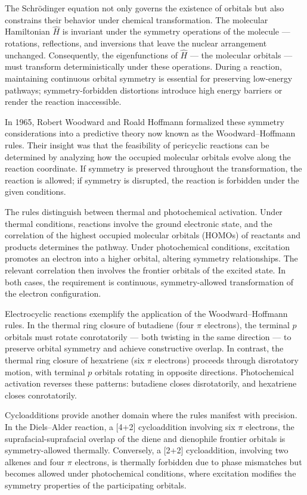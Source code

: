 The Schrödinger equation not only governs the existence of orbitals but also constrains their behavior under chemical transformation. The molecular Hamiltonian $\hat{H}$ is invariant under the symmetry operations of the molecule — rotations, reflections, and inversions that leave the nuclear arrangement unchanged. Consequently, the eigenfunctions of $\hat{H}$ — the molecular orbitals — must transform deterministically under these operations. During a reaction, maintaining continuous orbital symmetry is essential for preserving low-energy pathways; symmetry-forbidden distortions introduce high energy barriers or render the reaction inaccessible.

In 1965, Robert Woodward and Roald Hoffmann formalized these symmetry considerations into a predictive theory now known as the Woodward–Hoffmann rules. Their insight was that the feasibility of pericyclic reactions can be determined by analyzing how the occupied molecular orbitals evolve along the reaction coordinate. If symmetry is preserved throughout the transformation, the reaction is allowed; if symmetry is disrupted, the reaction is forbidden under the given conditions.

The rules distinguish between thermal and photochemical activation. Under thermal conditions, reactions involve the ground electronic state, and the correlation of the highest occupied molecular orbitals (HOMOs) of reactants and products determines the pathway. Under photochemical conditions, excitation promotes an electron into a higher orbital, altering symmetry relationships. The relevant correlation then involves the frontier orbitals of the excited state. In both cases, the requirement is continuous, symmetry-allowed transformation of the electron configuration.

Electrocyclic reactions exemplify the application of the Woodward–Hoffmann rules. In the thermal ring closure of butadiene (four $\pi$ electrons), the terminal $p$ orbitals must rotate conrotatorily — both twisting in the same direction — to preserve orbital symmetry and achieve constructive overlap. In contrast, the thermal ring closure of hexatriene (six $\pi$ electrons) proceeds through disrotatory motion, with terminal $p$ orbitals rotating in opposite directions. Photochemical activation reverses these patterns: butadiene closes disrotatorily, and hexatriene closes conrotatorily.

Cycloadditions provide another domain where the rules manifest with precision. In the Diels–Alder reaction, a [4+2] cycloaddition involving six $\pi$ electrons, the suprafacial-suprafacial overlap of the diene and dienophile frontier orbitals is symmetry-allowed thermally. Conversely, a [2+2] cycloaddition, involving two alkenes and four $\pi$ electrons, is thermally forbidden due to phase mismatches but becomes allowed under photochemical conditions, where excitation modifies the symmetry properties of the participating orbitals.

